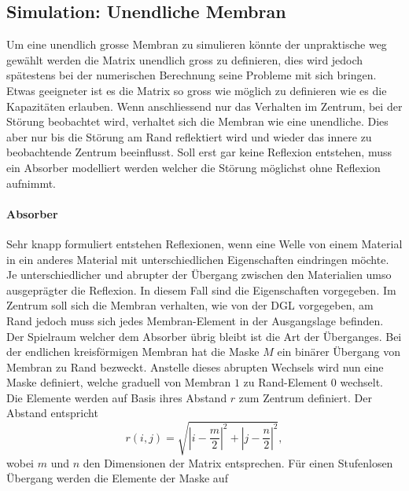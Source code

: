 \subsection{Simulation: Unendliche Membran}

Um eine unendlich grosse Membran zu simulieren könnte der unpraktische weg gewählt werden die Matrix unendlich gross zu definieren, dies wird jedoch spätestens bei der numerischen Berechnung seine Probleme mit sich bringen.
Etwas geeigneter ist es die Matrix so gross wie möglich zu definieren wie es die Kapazitäten erlauben.
Wenn anschliessend nur das Verhalten im Zentrum, bei der Störung beobachtet wird, verhaltet sich die Membran wie eine unendliche. 
Dies aber nur bis die Störung am Rand reflektiert wird und wieder das innere zu beobachtende Zentrum beeinflusst.
Soll erst gar keine Reflexion entstehen, muss ein Absorber modelliert werden welcher die Störung möglichst ohne Reflexion aufnimmt.

\paragraph{Absorber}
Sehr knapp formuliert entstehen Reflexionen, wenn eine Welle von einem Material in ein anderes Material mit unterschiedlichen Eigenschaften eindringen möchte.
Je unterschiedlicher und abrupter der Übergang zwischen den Materialien umso ausgeprägter die Reflexion.
In diesem Fall sind die Eigenschaften vorgegeben.
Im Zentrum soll sich die Membran verhalten, wie von der DGL vorgegeben, am Rand jedoch muss sich jedes Membran-Element in der Ausgangslage befinden. 
Der Spielraum welcher dem Absorber übrig bleibt ist die Art der Überganges.
Bei der endlichen kreisförmigen Membran hat die Maske $M$ ein binärer Übergang von Membran zu Rand bezweckt.
Anstelle dieses abrupten Wechsels wird nun eine Maske definiert, welche graduell von Membran $1$ zu Rand-Element $0$ wechselt.
Die Elemente werden auf Basis ihres Abstand $r$ zum Zentrum definiert. 
Der Abstand entspricht 
\begin{equation*}
	r(i,j) = \sqrt{|i-\frac{m}{2}|^2+|j-\frac{n}{2}|^2},
\end{equation*} 
wobei $ m $ und $n$ den Dimensionen der Matrix entsprechen.
Für einen Stufenlosen Übergang werden die Elemente der Maske auf 

